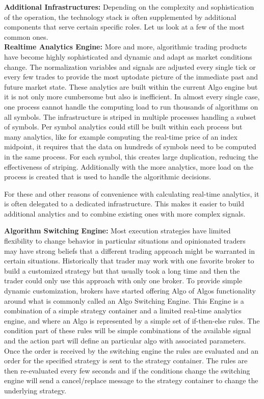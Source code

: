 \noindent\textbf{Additional Infrastructures:} Depending on the complexity and sophistication of the operation, the technology stack is often supplemented by additional components that serve certain specific roles. Let us look at a few of the most common ones. \\


\noindent\textbf{Realtime Analytics Engine:} More and more, algorithmic trading products have become highly sophisticated and dynamic and adapt as market conditions change. The normalization variables and signals are adjusted every single tick or every few trades to provide the most uptodate picture of the immediate past and future market state. These analytics are built within the current Algo engine but it is not only more cumbersome but also is inefficient. In almost every single case, one process cannot handle the computing load to run thousands of algorithms on all symbols. The infrastructure is striped in multiple processes handling a subset of symbols. Per symbol analytics could still be built within each process but many analytics, like for example computing the real-time price of an index midpoint, it requires that the data on hundreds of symbols need to be computed in the same process. For each symbol, this creates large duplication, reducing the effectiveness of striping. Additionally with the more analytics, more load on the process is created that is used to handle the algorithmic decisions.


For these and other reasons of convenience with calculating real-time analytics, it is often delegated to a dedicated infrastructure. This makes it easier to build additional analytics and to combine existing ones with more complex signals. 


\noindent\textbf{Algorithm Switching Engine:} Most execution strategies have limited flexibility to change behavior in particular situations and opinionated traders may have strong beliefs that a different trading approach might be warranted in certain situations. Historically that trader may work with one favorite broker to build a customized strategy but that usually took a long time and then the trader could only use this approach with only one broker. To provide simple dynamic customization, brokers have started offering Algo of Algos functionality around what is commonly called an Algo Switching Engine. This Engine is a combination of a simple strategy container and a limited real-time analytics engine, and where an Algo is represented by a simple set of if-then-else rules. The condition  part of these rules will be simple combinations of the available signal and the action part will define an particular algo with associated parameters. Once the order is received by the switching engine the rules are evaluated and an order for the specified strategy is sent to the strategy container. The rules are then re-evaluated every few seconds and if the conditions change the switching engine will send a cancel/replace message to the strategy container to change the underlying strategy. 


